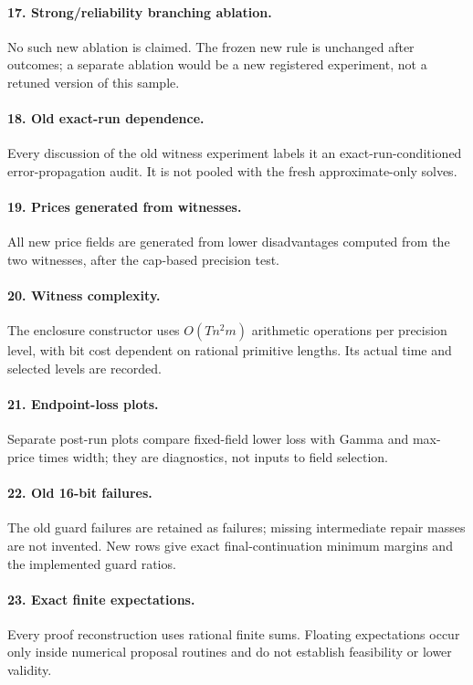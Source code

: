 \paragraph{17. Strong/reliability branching ablation.} No such new ablation is claimed. The frozen new rule is unchanged after outcomes; a separate ablation would be a new registered experiment, not a retuned version of this sample.

\paragraph{18. Old exact-run dependence.} Every discussion of the old witness experiment labels it an exact-run-conditioned error-propagation audit. It is not pooled with the fresh approximate-only solves.

\paragraph{19. Prices generated from witnesses.} All new price fields are generated from lower disadvantages computed from the two witnesses, after the cap-based precision test.

\paragraph{20. Witness complexity.} The enclosure constructor uses $O(Tn^2m)$ arithmetic operations per precision level, with bit cost dependent on rational primitive lengths. Its actual time and selected levels are recorded.

\paragraph{21. Endpoint-loss plots.} Separate post-run plots compare fixed-field lower loss with Gamma and max-price times width; they are diagnostics, not inputs to field selection.

\paragraph{22. Old 16-bit failures.} The old guard failures are retained as failures; missing intermediate repair masses are not invented. New rows give exact final-continuation minimum margins and the implemented guard ratios.

\paragraph{23. Exact finite expectations.} Every proof reconstruction uses rational finite sums. Floating expectations occur only inside numerical proposal routines and do not establish feasibility or lower validity.

